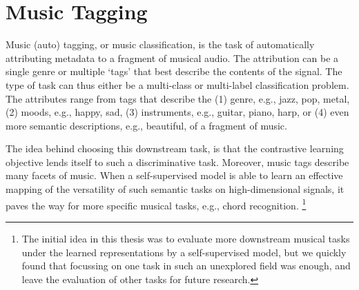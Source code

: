 \section{Music Tagging}\label{sec:task_description}
Music (auto) tagging, or music classification, is the task of automatically attributing metadata to a fragment of musical audio.
The attribution can be a single genre or multiple `tags' that best describe the contents of the signal.
The type of task can thus either be a multi-class or multi-label classification problem.
The attributes range from tags that describe the (1) genre, e.g., jazz, pop, metal, (2) moods, e.g., happy, sad, (3) instruments, e.g., guitar, piano, harp, or (4) even more semantic descriptions, e.g., beautiful, of a fragment of music.

The idea behind choosing this downstream task, is that the contrastive learning objective lends itself to such a discriminative task.
Moreover, music tags describe many facets of music. When a self-supervised model is able to learn an effective mapping of the versatility of such semantic tasks on high-dimensional signals, it paves the way for more specific musical tasks, e.g., chord recognition. 
\footnote{The initial idea in this thesis was to evaluate more downstream musical tasks under the learned representations by a self-supervised model, but we quickly found that focussing on one task in such an unexplored field was enough, and leave the evaluation of other tasks for future research.}




